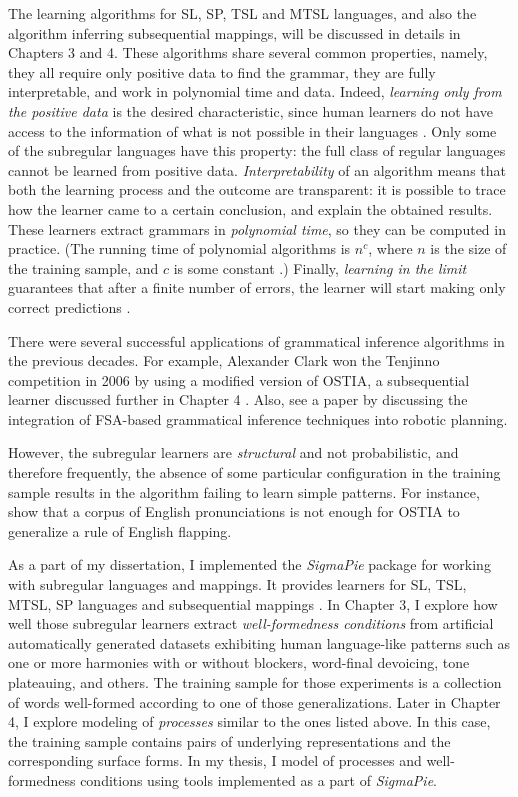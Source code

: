 The learning algorithms for SL, SP, TSL and MTSL languages, and also the algorithm inferring subsequential mappings, will be discussed in details in Chapters 3 and 4.
These algorithms share several common properties, namely, they all require only positive data to find the grammar, they are fully interpretable, and work in polynomial time and data.
Indeed, \emph{learning only from the positive data} is the desired characteristic, since human learners do not have access to the information of what is not possible in their languages \citep{Chomsky1986}.
Only some of the subregular languages have this property: the full class of regular languages cannot be learned from positive data.
\emph{Interpretability} of an algorithm means that both the learning process and the outcome are transparent: it is possible to trace how the learner came to a certain conclusion, and explain the obtained results.
These learners extract grammars in \emph{polynomial time}, so they can be computed in practice.
(The running time of polynomial algorithms is $n^c$, where $n$ is the size of the training sample, and $c$ is some constant \citep{Sipser2013}.)
Finally, \emph{learning in the limit} guarantees that after a finite number of errors, the learner will start making only correct predictions \citep{Gold1967}. 


There were several successful applications of grammatical inference algorithms in the previous decades.
For example, Alexander Clark won the Tenjinno competition in 2006 by using a modified version of OSTIA, a subsequential learner discussed further in Chapter 4 \citep{OncinaEtAl1993,Clark2006}.
Also, see a paper by \cite{Chandlee-FuEtAl-2012-IGIRP} discussing the integration of FSA-based grammatical inference techniques into robotic planning.


However, the subregular learners are \emph{structural} and not probabilistic, and therefore frequently, the absence of some particular configuration in the training sample results in the algorithm failing to learn simple patterns.
For instance, \cite{GildeaJurafsky1996} show that a corpus of English pronunciations is not enough for OSTIA to generalize a rule of English flapping.


As a part of my dissertation, I implemented the \emph{SigmaPie} package \href{https://pypi.org/project/SigmaPie/}{\faCube} for working with subregular languages and mappings.
It provides learners for SL, TSL, MTSL, SP languages and subsequential mappings \citep{sigmapie}.
In Chapter 3, I explore how well those subregular learners extract \emph{well-formedness conditions} from artificial automatically generated datasets exhibiting human language-like patterns such as one or more harmonies with or without blockers, word-final devoicing, tone plateauing, and others.
The training sample for those experiments is a collection of words well-formed according to one of those generalizations.
Later in Chapter 4, I explore modeling of \emph{processes} similar to the ones listed above.
In this case, the training sample contains pairs of underlying representations and the corresponding surface forms.
In my thesis, I model of processes and well-formedness conditions using tools implemented as a part of \emph{SigmaPie}.
